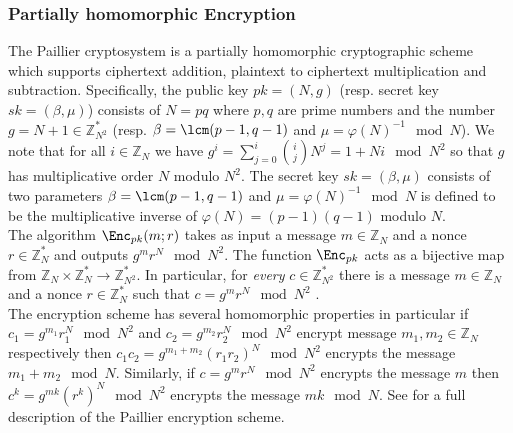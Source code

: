 \subsubsection{Partially homomorphic Encryption}
The  Paillier cryptosystem is a partially homomorphic cryptographic scheme which supports ciphertext addition, plaintext to ciphertext multiplication and subtraction.  Specifically, the public key $pk=(N,g)$ (resp. secret key $sk=(\beta, \mu)$) consists of $N=pq$ where $p,q$ are prime numbers and the number $g=N+1 \in \mathbb{Z}_{N^2}^*$ (resp. $\beta =\lcm(p-1,q-1)$ and $\mu=\varphi(N)^{-1} \mod N$). We note that for all $i \in \mathbb{Z}_N$ we have $g^i = \sum_{j=0}^i {i \choose j} N^j = 1+Ni \mod{N^2}$ so that $g$ has multiplicative order $N$ modulo $N^2$. The secret key $sk=(\beta,\mu)$ consists of two parameters $\beta=\lcm(p-1,q-1)$ and $\mu = \varphi(N)^{-1} \mod N$ is defined to be the multiplicative inverse of $\varphi(N) = (p-1)(q-1)$ modulo $N$. \\ 

The algorithm $\Enc_{pk}(m;r)$ takes as input a message $m \in \mathbb{Z}_N$ and a nonce $r \in \mathbb{Z}_N^*$ and outputs $g^{m}r^N \mod{N^2}$. The function $\Enc_{pk}$ acts as a bijective map from $\mathbb{Z}_N \times \mathbb{Z}_N^* \rightarrow \mathbb{Z}_{N^2}^*$. In particular, for {\em every} $c \in \mathbb{Z}_{N^2}^*$ there is a message $m \in \mathbb{Z}_N$ and a nonce $r \in \mathbb{Z}_N^*$ such that $c=g^m r^N \mod{N^2}$ \cite{EC:Paillier99}. \\


The encryption scheme has several homomorphic properties in particular if $c_1 = g^{m_1} r_1^N \mod{N^2}$ and $c_2= g^{m_2} r_2^N \mod{N^2}$ encrypt message $m_1,m_2 \in \mathbb{Z}_N$ respectively then $c_1c_2 = g^{m_1+m_2} (r_1r_2)^N \mod{N^2}$ encrypts the message $m_1+m_2 \mod N$. Similarly, if $c= g^m r^N \mod {N^2}$ encrypts the message $m$ then $c^k = g^{mk} (r^k)^N \mod {N^2}$ encrypts the message $mk \mod N$. See  for a full description of the Paillier encryption scheme. \\


